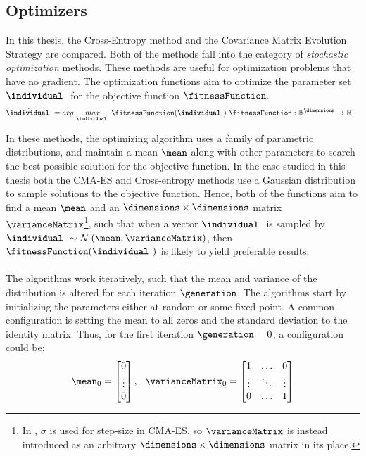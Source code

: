 \subsection{Optimizers \label{Optimizers}}

In this thesis, the Cross-Entropy method and the Covariance Matrix Evolution 
Strategy are compared. Both of the methods fall into the category of 
\textit{stochastic optimization}
methods. These methods are useful for 
optimization problems that have no gradient.
The optimization functions aim to optimize 
the parameter set $\textbf{\individual }$
for the objective function $\fitnessFunction$.
\begin{align*}
\hat{\textbf{\individual }} &= 
arg \  \underset{\textbf{\individual }}{max} \  
\fitnessFunction (\textbf{\individual }) \ 
\fitnessFunction : \mathbb{R}^{\dimensions } \rightarrow \mathbb{R}
\end{align*}

In these methods, the optimizing algorithm uses a family of parametric distributions,
and maintain a mean $\mean $ along with other parameters
to search the best possible solution for the objective function.  
In the case studied in this thesis
both the CMA-ES and Cross-entropy methods use a 
Gaussian distribution to sample solutions to the objective function.
Hence, both of the functions aim to find a mean 
$\mean $ and an $\dimensions \times \dimensions$ matrix 
$\varianceMatrix $\footnote{In \citep{hansen2011}, 
$\sigma$ is used for step-size in CMA-ES, so $\varianceMatrix $ is instead introduced
as an arbitrary $\dimensions \times \dimensions$ matrix in its place.}, such that when
a vector $\textbf{\individual }$ is sampled by 
$\textbf{\individual } \sim \mathcal{N}\left( \mean, \varianceMatrix \right)$, 
then $\fitnessFunction (\textbf{\individual })$ 
is likely to yield preferable results.\\
\\
The algorithms work iteratively, such that the mean and variance 
of the distribution 
is altered for each iteration $\generation $.
The algorithms start by initializing the 
parameters either at random or some fixed point. A common 
configuration is setting the mean to 
all zeros and the standard deviation to the identity matrix.
Thus, for the first iteration $\generation = 0$, a configuration could be:
\begin{align*}
\mean_{0} =
\begin{bmatrix}
0\\
\vdots\\
0
\end{bmatrix},\ \ 
\varianceMatrix _{0} = 
\begin{bmatrix}
1 & \hdots & 0\\
\vdots & \ddots & \vdots\\
0 & \hdots & 1
\end{bmatrix}
\end{align*}

